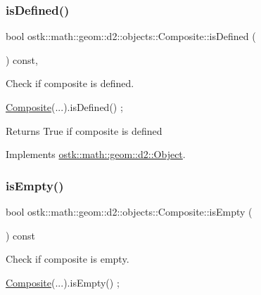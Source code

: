 \subsubsection{\texorpdfstring{is\+Defined()}{isDefined()}}
{\footnotesize\ttfamily bool ostk\+::math\+::geom\+::d2\+::objects\+::\+Composite\+::is\+Defined (\begin{DoxyParamCaption}{ }\end{DoxyParamCaption}) const\hspace{0.3cm}{\ttfamily [override]}, {\ttfamily [virtual]}}



Check if composite is defined. 


\begin{DoxyCode}
\hyperlink{classostk_1_1math_1_1geom_1_1d2_1_1objects_1_1_composite_ad05d10b391609de957f14ab9db998991}{Composite}(...).isDefined() ;
\end{DoxyCode}


\begin{DoxyReturn}{Returns}
True if composite is defined 
\end{DoxyReturn}


Implements \hyperlink{classostk_1_1math_1_1geom_1_1d2_1_1_object_a456cc7121218d24c1322d0fe54230cc4}{ostk\+::math\+::geom\+::d2\+::\+Object}.

\mbox{\label{classostk_1_1math_1_1geom_1_1d2_1_1objects_1_1_composite_a4e012f34d750db60779a362cb89a50e5}} 
\subsubsection{\texorpdfstring{is\+Empty()}{isEmpty()}}
{\footnotesize\ttfamily bool ostk\+::math\+::geom\+::d2\+::objects\+::\+Composite\+::is\+Empty (\begin{DoxyParamCaption}{ }\end{DoxyParamCaption}) const}



Check if composite is empty. 


\begin{DoxyCode}
\hyperlink{classostk_1_1math_1_1geom_1_1d2_1_1objects_1_1_composite_ad05d10b391609de957f14ab9db998991}{Composite}(...).isEmpty() ;
\end{DoxyCode}


